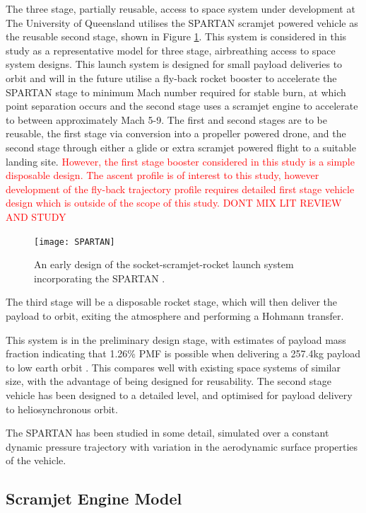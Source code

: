 The three stage, partially reusable, access to space system under development at The University of Queensland utilises the SPARTAN\cite{Jazra2013} scramjet powered vehicle as the reusable second stage, shown in Figure \ref{fig:SPARTAN}. This system is considered in this study as a representative model for three stage, airbreathing access to space system designs. This launch system is designed for small payload deliveries to orbit and will in the future utilise a fly-back rocket booster to accelerate the SPARTAN stage to minimum Mach number required for stable burn, at which point separation occurs and the second stage uses a scramjet engine to accelerate to between approximately Mach 5-9. The first and second stages are to be reusable, the first stage via conversion into a propeller powered drone, and the second stage through either a glide or extra scramjet powered flight to a suitable landing site. \textcolor{red}{However, the first stage booster considered in this study is a simple disposable design. The ascent profile is of interest to this study, however development of the fly-back trajectory profile requires detailed first stage vehicle design which is outside of the scope of this study. DONT MIX LIT REVIEW AND STUDY}

\begin{figure}[ht]
	\centering
	\texttt{[image: SPARTAN]}
	\caption{An early design of the socket-scramjet-rocket launch system incorporating the SPARTAN \cite{Jazra2013}.}
	\label{fig:SPARTAN}
\end{figure}

The third stage will be a disposable rocket stage, which will then deliver the payload to orbit, exiting the atmosphere and performing a Hohmann transfer. 

This system is in the preliminary design stage, with estimates of  payload mass fraction indicating that 1.26\% PMF is possible when delivering a 257.4kg payload to low earth orbit \cite{Preller2015a}. This compares well with existing space systems of similar size, with the advantage of being designed for reusability. The second stage vehicle has been designed to a detailed level, and optimised for payload delivery to heliosynchronous orbit.

The SPARTAN has been studied in some detail, simulated over a constant dynamic pressure trajectory with variation in the aerodynamic surface properties of the vehicle. 

\subsection{Scramjet Engine Model}

